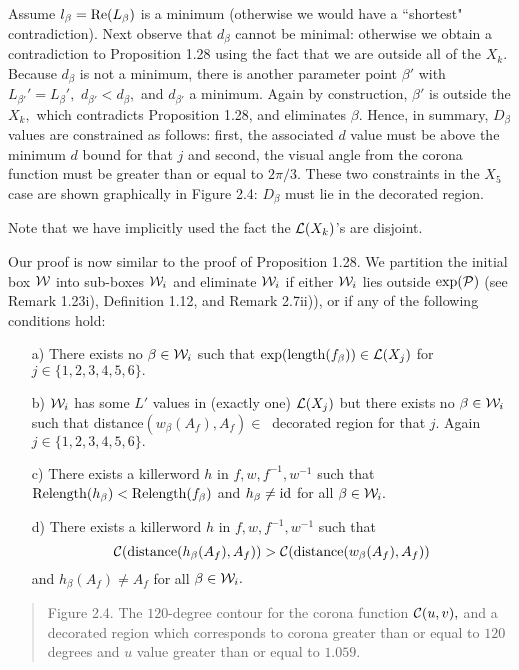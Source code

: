 Assume
$l_\beta = {\rm Re}(L_{\beta})$ is a minimum 
(otherwise we would have a ``shortest"
contradiction). Next observe that $d_\beta$ cannot be minimal:
otherwise we obtain a contradiction to Proposition 1.28 using
the fact that we are outside all of the $X_k.$
Because $d_\beta$ is not a
minimum, there is another
parameter point ${\beta}'$ with $L_{{\beta}'}'=L_\beta',$
$d_{{\beta}'}<d_\beta,$ and $d_{{\beta}'}$ a minimum.
Again by construction, ${\beta}'$ is outside the $X_k,$
which contradicts Proposition 1.28, and
eliminates $\beta.$
Hence, in summary,
$D_\beta$ values are constrained as follows:
first, the associated $d$ value must be above
the minimum $d$ bound for that $j$ and
second, the visual angle from the corona function
must be greater than or equal to $2\pi/3.$
These two constraints in the $X_5$ case are
shown graphically in Figure 2.4: $D_\beta$ must lie in
the decorated region.

Note that we have implicitly used the fact the
${\cal L}(X_k)$'s are disjoint.


Our proof is now similar to the proof of Proposition 1.28.
We partition the
initial box ${\cal W}$ into sub-boxes ${\cal W}_i$ and eliminate ${\cal
W}_i$ if either ${\cal W}_i$ lies outside $\exp({\cal P})$ (see Remark
1.23i), Definition 1.12, and Remark 2.7ii)),
or if any of the following conditions   hold:  
\vglue-20pt
\phantom{ho}
\begin{itemize}
\item[a)]  There exists no $\beta\in {\cal W}_i$ such that
$\exp({\rm length}(f_\beta)) \in {\cal L}(X_j)$   for
$j\in\{1,2,3,4,5,6\}.$ 

\item[b)]  ${\cal W}_i$ has some  $L'$ values in (exactly one) ${\cal L}(X_j)$ but
there exists no $\beta\in {\cal W}_i$ such that distance$(w_\beta(A_f),
A_f)\in\ $ decorated region for that $j$.  Again $j\in\{1,2,3,4,5,6\}.$

\item[c)]  There exists a killerword $h$ in $f,w,f^{-1},w^{-1}$ such that
${\rm Relength}(h_\beta) < {\rm Relength}(f_\beta)$  and $h_\beta \neq {\rm id}$
for all $\beta\in {\cal W}_i.$

\item[d)]  There exists a killerword $h$ in $f,w,f^{-1},w^{-1}$ such that
$${\cal C}({\rm distance}(h_\beta(A_f), A_f)) >{\cal C}({\rm distance}(w_\beta(A_f),
A_f))$$ and $h_\beta(A_f) \neq A_f$ for all $\beta\in {\cal W}_i.$
\end{itemize}

\begin{quote}
Figure 2.4. The $120$-degree contour for the corona function
${\cal C}(u,v),$ and a decorated region which corresponds to corona greater
than or equal to $120$ degrees and $u$ value greater than or equal to $1.059$.
\end{quote}

